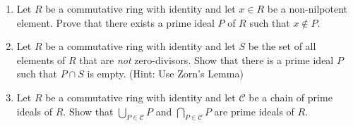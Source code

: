 \documentclass{article}
\theoremstyle{definition}
\newcommand{\N}{\mathbb{N}}
\newcommand{\set}[1]{\left\{#1\right\}}
\newcommand{\es}{\text{\O}}
\begin{document}
\begin{enumerate}
\begin{proof}
                For (b), let $r\in R$ be nilpotent. Then $r^n=0$ for some $n\in \N$. Since $r^n=0\in P$ for all prime ideals $P\subseteq R$, then $r\in P$ for all prime ideals. Therefore $r\in \bigcap_{\set{P\mid P\subseteq R \text{ is a prime ideal}}}P$.

                Now suppose $r\in \bigcap_{\set{P\mid P\subseteq R \text{ is a prime ideal}}} P$. Suppose $r$ is not nilpotent. 
                
                Then we can define $\mathcal{R}=\set{r^n\mid n\in \N}$. Now define $\mathcal{M}=\set{I\subseteq R\setminus \mathcal{R}\mid I \text{ is an ideal of } R}$. Now let $\mathcal{C}$ be a chain of ideals of $\mathcal{M}$. Then note that $U=\bigcup_{\set{U_c\in \mathcal{C}}}U_c$ is an ideal, an upper bound for $\mathcal{C}$ and $U\cap \mathcal{R}=\es$ since $U_c\cap \mathcal{R}=\es$ for all $U_c\in \mathcal{C}$. Thus $U\in \mathcal{M}$ and by Zorn's lemma $\mathcal{M}$ has a maximal element say $M$. 
                
                Now we want to show that $M$ is a prime ideal and arrive at a contradiction. Suppose $a,b\in R\setminus M$. Then $M\subsetneq M+(a)$ and $M\subsetneq M+(b)$. So $M+(a)\notin \mathcal{M}$ and $M+(b)\notin \mathcal{M}$. So there exists $m,n\in \N$ such that $r^n\in M+(a)$ and $r^m\in M+(b)$. Then $r^{m+n}\in M+(ab)\notin \mathcal{M}$. Therefore $ab\notin M$ and so $M$ is prime, a contradiction to $r$ being contained in all prime ideals of $R$. 

            \end{proof}

            \item Let $R$ be a commutative ring with identity and let $x\in R$ be a non-nilpotent element. Prove that there exists a prime ideal $P$ of $R$ such that $x\notin P$.
            
            \item Let $R$ be a commutative ring with identity and let $S$ be the set of all elements of $R$ that are \textit{not} zero-divisors. Show that there is a prime ideal $P$ such that $P\cap S$ is empty. (Hint: Use Zorn's Lemma)
            
            \item Let $R$ be a commutative ring with identity and let $\mathcal{C}$ be a chain of prime ideals of $R$. Show that $\bigcup _{P\in \mathcal{C}} P$ and $\bigcap _{P\in \mathcal{C}} P$ are prime ideals of $R$.
            

\end{enumerate}
\end{document}
